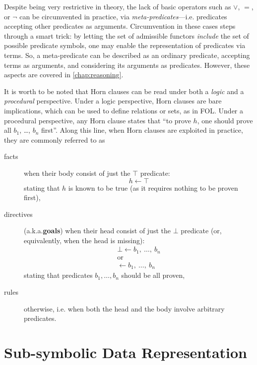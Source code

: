 \documentclass[12pt,a4paper,openright,twoside]{book}
\begin{document}
Despite being very restrictive in theory, the lack of basic operators such as $\vee$, $=$, or $\lnot$ can be circumvented in practice, via \emph{meta-predicates}---i.e. predicates accepting other predicates as arguments.
%
Circumvention in these cases steps through a smart trick: by letting the set of admissible functors \emph{include} the set of possible predicate symbols, one may enable the representation of predicates via terms.
%
So, a meta-predicate can be described as an ordinary predicate, accepting terms as arguments, and considering its arguments as predicates. 
%
However, these aspects are covered in \cref{chap:reasoning}.

It is worth to be noted that Horn clauses can be read under both a \emph{logic} and a \emph{procedural} perspective.
%
Under a logic perspective, Horn clauses are bare implications, which can be used to define relations or sets, as in FOL.
%
Under a procedural perspective, any Horn clause states that ``to prove $h$, one should prove all $b_1$, \ldots, $b_n$ first''.
%
Along this line, when Horn clauses are exploited in practice, they are commonly referred to as
%
\begin{description}
    \item[facts] when their body consist of just the $\top$ predicate: 
    $$ h \leftarrow \top $$
    stating that $h$ is known to be true (as it requires nothing to be proven first),

    \item[directives] (a.k.a.\textbf{goals}) when their head consist of just the $\bot$ predicate (or, equivalently, when the head is missing): 
    $$\begin{array}{c}
        \bot \leftarrow b_1,\ \ldots,\ b_n
        \\\text{or}\\
        \leftarrow b_1,\ \ldots,\ b_n
    \end{array}$$ 
    stating that predicates $b_1, \ldots, b_n$ should be all proven,

    \item[rules] otherwise, i.e. when both the head and the body involve arbitrary predicates.
\end{description}

\section{Sub-symbolic Data Representation}

\end{document}
